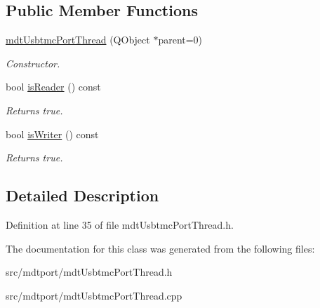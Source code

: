 \subsection*{Public Member Functions}
\begin{DoxyCompactItemize}
\item 
\hypertarget{classmdt_usbtmc_port_thread_afc02cdf1c178b56ff42fdf997df1014c}{
\hyperlink{classmdt_usbtmc_port_thread_afc02cdf1c178b56ff42fdf997df1014c}{mdtUsbtmcPortThread} (QObject $\ast$parent=0)}
\label{classmdt_usbtmc_port_thread_afc02cdf1c178b56ff42fdf997df1014c}

\begin{DoxyCompactList}\small\item\em Constructor. \end{DoxyCompactList}\item 
\hypertarget{classmdt_usbtmc_port_thread_a27c115427b49d5ae988c9f9c9a5e402a}{
bool \hyperlink{classmdt_usbtmc_port_thread_a27c115427b49d5ae988c9f9c9a5e402a}{isReader} () const }
\label{classmdt_usbtmc_port_thread_a27c115427b49d5ae988c9f9c9a5e402a}

\begin{DoxyCompactList}\small\item\em Returns true. \end{DoxyCompactList}\item 
\hypertarget{classmdt_usbtmc_port_thread_a4c58b7140f0483a19723b14487907423}{
bool \hyperlink{classmdt_usbtmc_port_thread_a4c58b7140f0483a19723b14487907423}{isWriter} () const }
\label{classmdt_usbtmc_port_thread_a4c58b7140f0483a19723b14487907423}

\begin{DoxyCompactList}\small\item\em Returns true. \end{DoxyCompactList}\end{DoxyCompactItemize}


\subsection{Detailed Description}


Definition at line 35 of file mdtUsbtmcPortThread.h.



The documentation for this class was generated from the following files:\begin{DoxyCompactItemize}
\item 
src/mdtport/mdtUsbtmcPortThread.h\item 
src/mdtport/mdtUsbtmcPortThread.cpp\end{DoxyCompactItemize}
